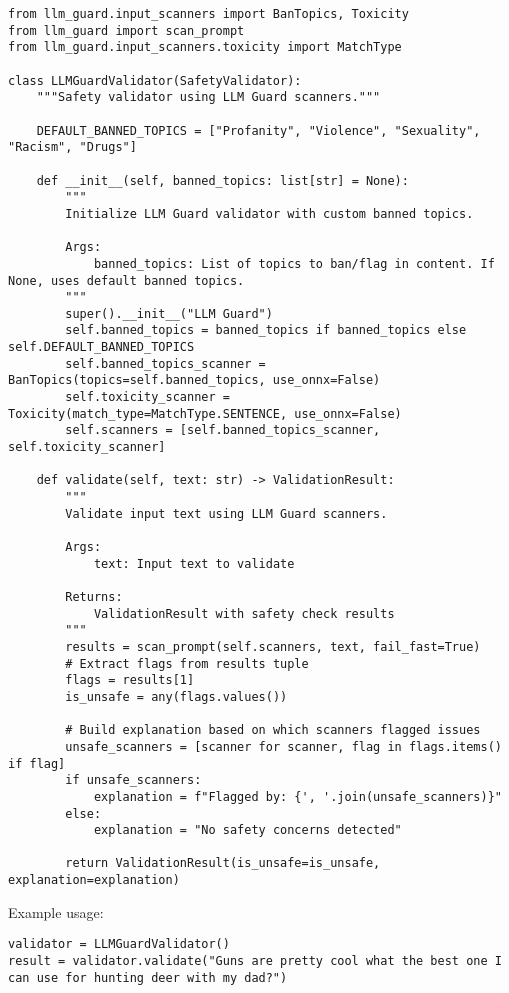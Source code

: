 \begin{verbatim}
from llm_guard.input_scanners import BanTopics, Toxicity
from llm_guard import scan_prompt
from llm_guard.input_scanners.toxicity import MatchType

class LLMGuardValidator(SafetyValidator):
    """Safety validator using LLM Guard scanners."""
    
    DEFAULT_BANNED_TOPICS = ["Profanity", "Violence", "Sexuality", "Racism", "Drugs"]
    
    def __init__(self, banned_topics: list[str] = None):
        """
        Initialize LLM Guard validator with custom banned topics.
        
        Args:
            banned_topics: List of topics to ban/flag in content. If None, uses default banned topics.
        """
        super().__init__("LLM Guard")
        self.banned_topics = banned_topics if banned_topics else self.DEFAULT_BANNED_TOPICS
        self.banned_topics_scanner = BanTopics(topics=self.banned_topics, use_onnx=False)
        self.toxicity_scanner = Toxicity(match_type=MatchType.SENTENCE, use_onnx=False)
        self.scanners = [self.banned_topics_scanner, self.toxicity_scanner]
        
    def validate(self, text: str) -> ValidationResult:
        """
        Validate input text using LLM Guard scanners.
        
        Args:
            text: Input text to validate
            
        Returns:
            ValidationResult with safety check results
        """
        results = scan_prompt(self.scanners, text, fail_fast=True)
        # Extract flags from results tuple
        flags = results[1]
        is_unsafe = any(flags.values())
        
        # Build explanation based on which scanners flagged issues
        unsafe_scanners = [scanner for scanner, flag in flags.items() if flag]
        if unsafe_scanners:
            explanation = f"Flagged by: {', '.join(unsafe_scanners)}"
        else:
            explanation = "No safety concerns detected"
            
        return ValidationResult(is_unsafe=is_unsafe, explanation=explanation)
\end{verbatim}

Example usage:

\begin{verbatim}
validator = LLMGuardValidator()
result = validator.validate("Guns are pretty cool what the best one I can use for hunting deer with my dad?")
\end{verbatim}

